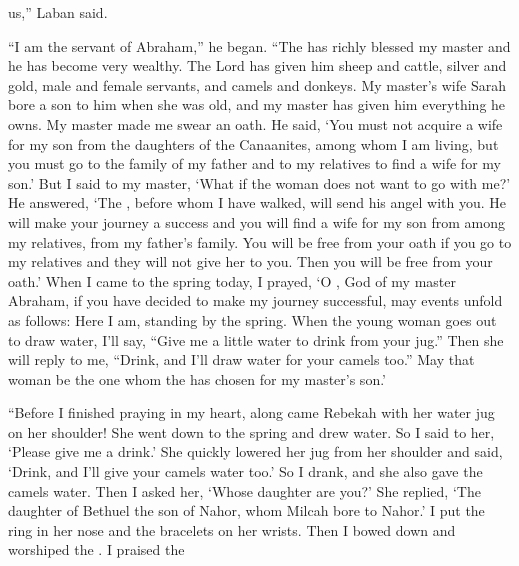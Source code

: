 {us,” Laban said.
\par }{\PP {}“I am
the servant
of Abraham,”
he began.
“The
{}
has richly blessed
my master
and he has become
very
wealthy.
The Lord has given
him sheep
and cattle,
silver
and gold,
male and female
servants,
and camels
and donkeys.
My master’s
wife
Sarah
bore
a son
to him
when she was
old, and my master
has given
him everything
he owns.
My master
made me swear
an oath. He said,
‘You must not
acquire
a wife
for my son
from the daughters
of the Canaanites,
among whom
I am
living,
but
you must
go
to
the family
of my father
and to
my relatives
to find
a wife
for my son.’
But I said
to
my master,
‘What if
the woman
does not
want to go with me?’
He answered,
‘The
{}, before
whom
I have walked,
will send
his angel
with
you. He will make your journey
a success
and you will find
a wife
for my son
from among my relatives,
from my father’s
family.
You will be free
from your oath
if
you go
to
my relatives
and they will
not
give
her to you. Then you will be
free
from your oath.’
When I came
to the spring
today,
I prayed,
‘O
{}, God
of my master
Abraham,
if
you have
decided
to make my journey
successful,
may events unfold as
follows:
Here
I am,
standing
by the spring.
When
the young woman goes
out
to draw
water,
I’ll say,
“Give
me
a little
water
to drink
from your jug.”
Then she will reply to
me, “Drink,
and I’ll
draw
water for your camels
too.” May that woman
be the one whom
the {}
has chosen
for my master’s
son.’
\par }{\PP {}“Before
I
finished
praying
in my heart,
along came
Rebekah
with her water jug
on
her shoulder! She went down
to the spring
and drew
water. So I said
to
her, ‘Please
give me a drink.’
She quickly
lowered
her jug
from her shoulder and said,
‘Drink,
and I’ll
give your camels
water
too.’
So I drank,
and she also
gave the camels
water.
Then I asked
her, ‘Whose
daughter
are you?’ She replied,
‘The daughter
of Bethuel
the son
of Nahor,
whom
Milcah
bore
to Nahor.’ I put
the ring
in her nose
and the bracelets
on
her wrists.
Then I bowed
down and worshiped
the {}. I praised
the

}
